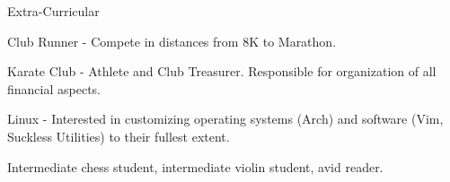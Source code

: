 \documentclass{resume} %
\begin{document}
\begin{rSection}{Extra-Curricular} \itemsep -3pt
	\item Club Runner - Compete in distances from 8K to Marathon.
	\item Karate Club - Athlete and Club Treasurer. Responsible for organization of all financial aspects.
	\item Linux - Interested in customizing operating systems (Arch) and software (Vim, Suckless Utilities) to their fullest extent.
	\item Intermediate chess student, intermediate violin student, avid reader.
\end{rSection}
\end{document}
